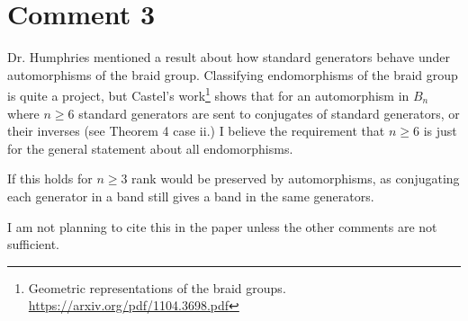 \documentclass{article}
\begin{document}
\section*{Comment 3}

Dr. Humphries mentioned a result about how standard
generators behave under automorphisms of the braid group.
Classifying endomorphisms of the braid group is quite a project,
but Castel's work\footnote{Geometric representations of the braid groups. \url{https://arxiv.org/pdf/1104.3698.pdf}}
shows that for an automorphism in $B_{n}$ where $n \geq 6$
standard generators are sent to conjugates of standard generators,
or their inverses (see Theorem 4 case ii.)
I believe the requirement that $n \geq 6$ is just for the general statement
about all endomorphisms.

If this holds for $n \geq 3$ rank would be preserved by automorphisms,
as conjugating each generator in a band still gives a band in the same generators.

I am not planning to cite this in the paper unless the other comments are not sufficient.
\end{document}
